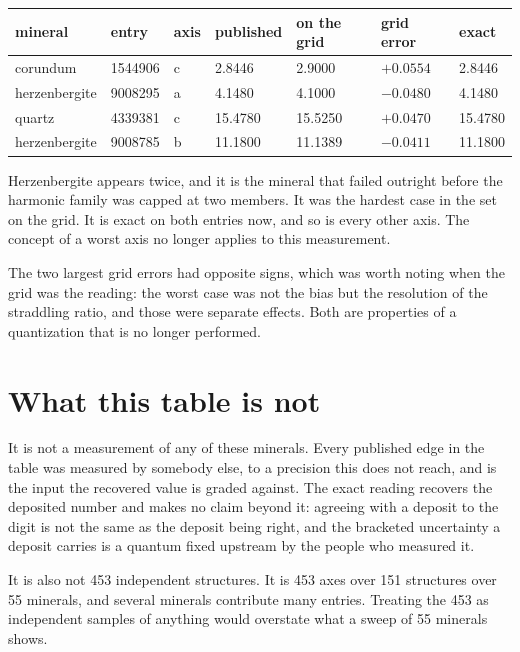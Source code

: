 \begin{longtable}{@{}p{}p{}p{}p{}p{}p{}p{}@{}}
\toprule
mineral & entry & axis & published & on the grid & grid error & exact \\
\midrule
\endhead
corundum & 1544906 & c & 2.8446 & 2.9000 & $+0.0554$ & 2.8446 \\
herzenbergite & 9008295 & a & 4.1480 & 4.1000 & $-0.0480$ & 4.1480 \\
quartz & 4339381 & c & 15.4780 & 15.5250 & $+0.0470$ & 15.4780 \\
herzenbergite & 9008785 & b & 11.1800 & 11.1389 & $-0.0411$ & 11.1800 \\
\bottomrule
\end{longtable}

Herzenbergite appears twice, and it is the mineral that failed outright before the harmonic family was capped at two members. It was the hardest case in the set on the grid. It is exact on both entries now, and so is every other axis. The concept of a worst axis no longer applies to this measurement.

The two largest grid errors had opposite signs, which was worth noting when the grid was the reading: the worst case was not the bias but the resolution of the straddling ratio, and those were separate effects. Both are properties of a quantization that is no longer performed.

\section{What this table is not}

It is not a measurement of any of these minerals. Every published edge in the table was measured by somebody else, to a precision this does not reach, and is the input the recovered value is graded against. The exact reading recovers the deposited number and makes no claim beyond it: agreeing with a deposit to the digit is not the same as the deposit being right, and the bracketed uncertainty a deposit carries is a quantum fixed upstream by the people who measured it.

It is also not 453 independent structures. It is 453 axes over 151 structures over 55 minerals, and several minerals contribute many entries. Treating the 453 as independent samples of anything would overstate what a sweep of 55 minerals shows.
